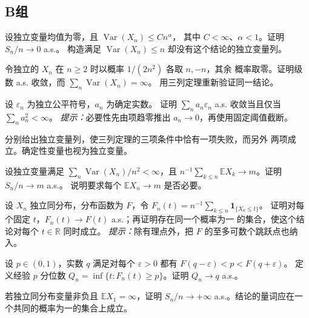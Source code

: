 \subsection*{B组}
\begin{enumerate}[label=\textbf{\thechapter.\arabic*.},resume]
设独立变量均值为零，且 $\operatorname{Var}(X_n)\le Cn^\alpha$，
其中 $C<\infty$、$\alpha<1$。证明 $S_n/n\to0$ a.s.。
构造满足 $\operatorname{Var}(X_n)\le n$ 却没有这个结论的独立变量列。

令独立的 $X_n$ 在 $n\ge2$ 时以概率 $1/(2n^2)$ 各取 $n,-n$，其余
概率取零。证明级数 a.s. 收敛，而 $\sum_n\operatorname{Var}(X_n)=\infty$。
用三列定理重新验证同一结论。

设 $\varepsilon_n$ 为独立公平符号，$a_n$ 为确定实数。
证明 $\sum_na_n\varepsilon_n$ a.s. 收敛当且仅当 $\sum_na_n^2<\infty$。
\emph{提示：}必要性先由项趋零推出 $a_n\to0$，再使用固定阈值截断。

分别给出独立变量列，使三列定理的三项条件中恰有一项失败，而另外
两项成立。确定性变量也视为独立变量。

设独立变量满足 $\sum_n\operatorname{Var}(X_n)/n^2<\infty$，且
$n^{-1}\sum_{k\le n}\mathbb E X_k\to m$。证明 $S_n/n\to m$ a.s.。
说明要求每个 $\mathbb E X_n\to m$ 是否必要。

设 $X_n$ 独立同分布，分布函数为 $F$，令
$F_n(t)=n^{-1}\sum_{k\le n}\mathbf1_{\{X_k\le t\}}$。
证明对每个固定 $t$，$F_n(t)\to F(t)$ a.s.；再证明存在同一个概率为一
的集合，使这个结论对每个 $t\in\mathbb R$ 同时成立。
\emph{提示：}除有理点外，把 $F$ 的至多可数个跳跃点也纳入。

设 $p\in(0,1)$，实数 $q$ 满足对每个 $\varepsilon>0$ 都有
$F(q-\varepsilon)<p<F(q+\varepsilon)$。
定义经验 $p$ 分位数 $Q_n=\inf\{t:F_n(t)\ge p\}$。证明 $Q_n\to q$ a.s.。

若独立同分布变量非负且 $\mathbb EX_1=\infty$，证明
$S_n/n\to+\infty$ a.s.。结论的量词应在一个共同的概率为一的集合上成立。
\end{enumerate}

